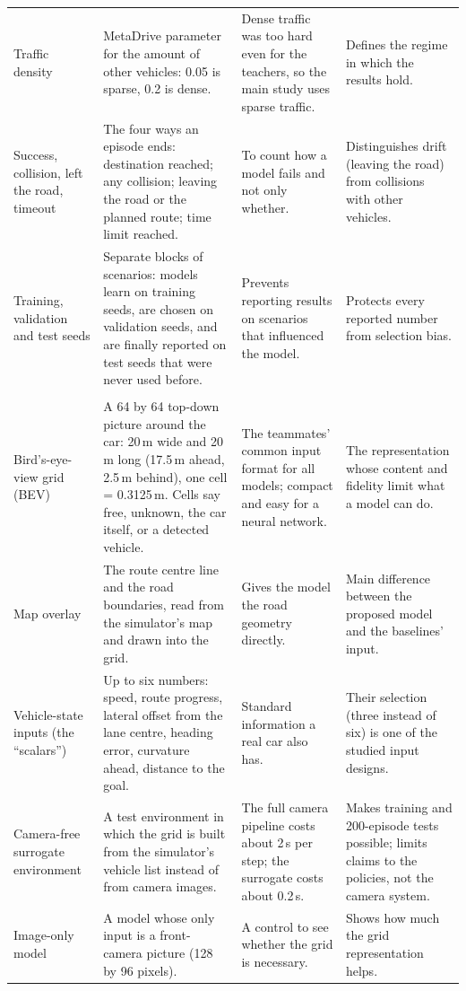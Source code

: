 {\begin{longtable}{@{}>{\raggedright\arraybackslash}p{3.1cm}>{\raggedright\arraybackslash}p{4.6cm}>{\raggedright\arraybackslash}p{3.7cm}>{\raggedright\arraybackslash}p{4.0cm}@{}}
Traffic density & MetaDrive parameter for the amount of other vehicles: 0.05 is sparse, 0.2 is dense. & Dense traffic was too hard even for the teachers, so the main study uses sparse traffic. & Defines the regime in which the results hold.\\
Success, collision, left the road, timeout & The four ways an episode ends: destination reached; any collision; leaving the road or the planned route; time limit reached. & To count how a model fails and not only whether. & Distinguishes drift (leaving the road) from collisions with other vehicles.\\
Training, validation and test seeds & Separate blocks of scenarios: models learn on training seeds, are chosen on validation seeds, and are finally reported on test seeds that were never used before. & Prevents reporting results on scenarios that influenced the model. & Protects every reported number from selection bias.\\
\multicolumn{4}{@{}l}{\textbf{What a model sees}}\\
Bird's-eye-view grid (BEV) & A 64 by 64 top-down picture around the car: 20\,m wide and 20\,m long (17.5\,m ahead, 2.5\,m behind), one cell = 0.3125\,m. Cells say free, unknown, the car itself, or a detected vehicle. & The teammates' common input format for all models; compact and easy for a neural network. & The representation whose content and fidelity limit what a model can do.\\
Map overlay & The route centre line and the road boundaries, read from the simulator's map and drawn into the grid. & Gives the model the road geometry directly. & Main difference between the proposed model and the baselines' input.\\
Vehicle-state inputs (the ``scalars'') & Up to six numbers: speed, route progress, lateral offset from the lane centre, heading error, curvature ahead, distance to the goal. & Standard information a real car also has. & Their selection (three instead of six) is one of the studied input designs.\\
Camera-free surrogate environment & A test environment in which the grid is built from the simulator's vehicle list instead of from camera images. & The full camera pipeline costs about 2\,s per step; the surrogate costs about 0.2\,s. & Makes training and 200-episode tests possible; limits claims to the policies, not the camera system.\\
Image-only model & A model whose only input is a front-camera picture (128 by 96 pixels). & A control to see whether the grid is necessary. & Shows how much the grid representation helps.\\

\end{longtable}}
